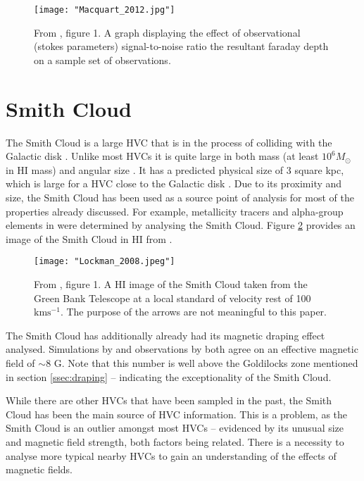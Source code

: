 \begin{figure}
    \texttt{[image: "Macquart\_2012.jpg"]}
    \centering
    \caption{From \citep{ID60}, figure 1. A graph displaying the effect of observational (stokes parameters) signal-to-noise ratio the resultant faraday depth on a sample set of observations.}
    \label{fig:snr}
\end{figure}

\section{Smith Cloud}
\label{sec:sc}

The Smith Cloud is a large HVC that is in the process of colliding with the Galactic disk \citep{ID28, ID64, ID35}. Unlike most HVCs it is quite large in both mass (at least $10^6 M_{\odot}$ in HI mass) and angular size \citep{ID28, ID64, ID35}. It has a predicted physical size of 3 square kpc, which is large for a HVC close to the Galactic disk \citep{ID28}. Due to its proximity and size, the Smith Cloud has been used as a source point of analysis for most of the properties already discussed. For example, metallicity tracers and alpha-group elements in \cite{ID48, ID49} were determined by analysing the Smith Cloud. Figure \ref{fig:sc} provides an image of the Smith Cloud in HI from \cite{ID28}.

\begin{figure}
    \texttt{[image: "Lockman\_2008.jpeg"]}
    \centering
    \caption{From \citep{ID28}, figure 1. A HI image of the Smith Cloud taken from the Green Bank Telescope at a local standard of velocity rest of 100 $\mathrm{kms^{-1}}$. The purpose of the arrows are not meaningful to this paper.}
    \label{fig:sc}
\end{figure}


The Smith Cloud has additionally already had its magnetic draping effect analysed. Simulations by \citep{ID23} and observations by \citep{ID26} both agree on an effective magnetic field of $\sim$8 {\textmu}G. Note that this number is well above the Goldilocks zone mentioned in section \ref{ssec:draping} – indicating the exceptionality of the Smith Cloud.


While there are other HVCs that have been sampled in the past, the Smith Cloud has been the main source of HVC information. This is a problem, as the Smith Cloud is an outlier amongst most HVCs – evidenced by its unusual size and magnetic field strength, both factors being related. There is a necessity to analyse more typical nearby HVCs to gain an understanding of the effects of magnetic fields.

